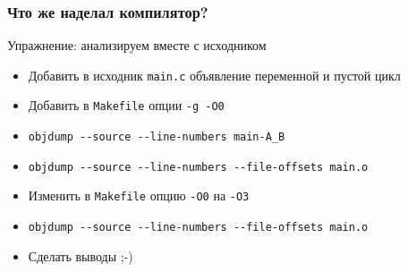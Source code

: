 \begin{frame}
	\frametitle{Что же наделал компилятор?}

	\begin{block}{Упражнение: анализируем вместе с исходником}
		\begin{itemize}
			\item Добавить в исходник {\tt main.c} объявление переменной и пустой цикл
			\item Добавить в {\tt Makefile} опции {\tt -g -O0}
			\item {\tt objdump -{}-source -{}-line-numbers main-A\_B}
			\item {\tt objdump -{}-source -{}-line-numbers -{}-file-offsets main.o}
			\item Изменить в {\tt Makefile} опцию {\tt -O0} на {\tt -O3}
			\item {\tt objdump -{}-source -{}-line-numbers -{}-file-offsets main.o}
			\item Сделать выводы ;-)
		\end{itemize}
	\end{block}
\end{frame}

